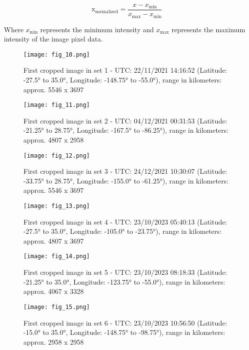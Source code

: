 \begin{equation}
\text{x}_{\text{normalized}} = \frac{x - x_{\text{min}}}{x_{\text{max}} - x_{\text{min}}}
\end{equation}

Where \( x_{\text{min}} \) represents the minimum intensity and \( x_{\text{max}} \) represents the maximum intensity of the image pixel data.
\FloatBarrier
\begin{figure}[h!] 
    \centering
    \texttt{[image: fig\_10.png]}
    \caption{First cropped image in set 1 - UTC: 22/11/2021 14:16:52 (Latitude: -27.5° to 35.0°, Longitude: -148.75° to -55.0°), range in kilometers: approx. 5546 x 3697}
\end{figure}
\FloatBarrier
\begin{figure}[h!]
    \centering
    \texttt{[image: fig\_11.png]}
    \caption{First cropped image in set 2 - UTC: 04/12/2021 00:31:53 (Latitude: -21.25° to 28.75°, Longitude: -167.5° to -86.25°), range in kilometers: approx. 4807 x 2958}
\end{figure}
\FloatBarrier
\begin{figure}[h!]
    \centering
    \texttt{[image: fig\_12.png]}
    \caption{First cropped image in set 3 - UTC: 24/12/2021 10:30:07 (Latitude: -33.75° to 28.75°, Longitude: -155.0° to -61.25°), range in kilometers: approx. 5546 x 3697}
\end{figure}
\FloatBarrier
\begin{figure}[h!]
    \centering
    \texttt{[image: fig\_13.png]}
    \caption{First cropped image in set 4 - UTC: 23/10/2023 05:40:13 (Latitude: -27.5° to 35.0°, Longitude: -105.0° to -23.75°), range in kilometers: approx. 4807 x 3697}
\end{figure}
\FloatBarrier
\begin{figure}[h!]
    \centering
    \texttt{[image: fig\_14.png]}
    \caption{First cropped image in set 5 - UTC: 23/10/2023 08:18:33 (Latitude: -21.25° to 35.0°, Longitude: -123.75° to -55.0°), range in kilometers: approx. 4067 x 3328}
\end{figure}
\FloatBarrier
\begin{figure}[h!]
    \centering
    \texttt{[image: fig\_15.png]}
    \caption{First cropped image in set 6 - UTC: 23/10/2023 10:56:50 (Latitude: -15.0° to 35.0°, Longitude: -148.75° to -98.75°), range in kilometers: approx. 2958 x 2958}
\end{figure}
\FloatBarrier
